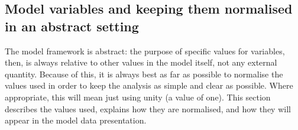 


\subsection{Model variables and keeping them normalised in an abstract setting}

The model framework is abstract: the purpose of specific values for variables, then, is always relative to other values in the model itself, not any external quantity. Because of this, it is always best as far as possible to normalise the values used in order to keep the analysis as simple and clear as possible. Where appropriate, this will mean just using unity (a value of one). This section describes the values used, explains how they are normalised, and how they will appear in the model data presentation.

